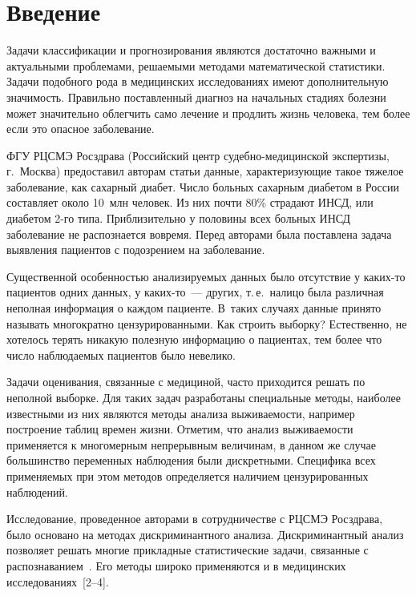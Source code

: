       \thispagestyle{headings}

      \begin{multicols}{2}

            \label{st\stat}

\section{Введение}

Задачи классификации и прогнозирования являются достаточно важными
и актуальными проб\-лемами, решаемыми методами математической
статистики. Задачи подобного рода в медицинских исследованиях
имеют дополнительную значимость. Правильно поставленный диагноз на
начальных стадиях болезни может значительно облегчить само лечение
и продлить жизнь человека, тем более если это опасное
заболевание.

ФГУ РЦСМЭ Росздрава (Российский центр су\-деб\-но-ме\-ди\-цин\-ской
экспертизы, г.~Москва) предоставил авторам статьи данные,
характеризующие такое тяжелое заболевание, как сахарный диабет.
Число больных сахарным диабетом в России составляет около 10~млн человек. 
Из них почти 80\% страдают ИНСД, или диабетом 2-го типа. Приблизительно у
половины всех больных ИНСД заболевание не распознается вовремя.
Перед авторами была поставлена задача выявления пациентов с
подозрением на заболевание.

Существенной особенностью анализируемых данных было отсутствие
у каких-то пациентов одних данных, у ка\-ких-то~--- других,
т.\,е.\ налицо была различная неполная информация о каждом пациенте. 
В~таких случаях данные принято называть многократно
цензурированными. Как строить выборку? Естественно, не хотелось
терять никакую полезную информацию о пациентах, тем более что
число наблюдаемых пациентов было невелико.

Задачи оценивания, связанные с медициной, часто приходится решать
по неполной выборке. Для таких задач разработаны специальные
методы, наиболее известными из них являются методы анализа
выживаемости, например построение таблиц времен жизни. Отметим,
что анализ выживаемости применяется к многомерным непрерывным
величинам, в данном же случае большинство переменных наблюдения
были дискретными. Специфика всех применяемых при этом методов
определяется наличием цензурированных наблюдений.

Исследование, проведенное авторами в сотрудничестве с РЦСМЭ Росздрава, было
основано на методах дискриминантного анализа. Дискриминантный
анализ позволяет решать многие прикладные статистические задачи,
связанные с распознаванием~\cite{book2}. Его методы широко применяются и в
медицинских исследованиях~[2--4]. %


\end{multicols}
